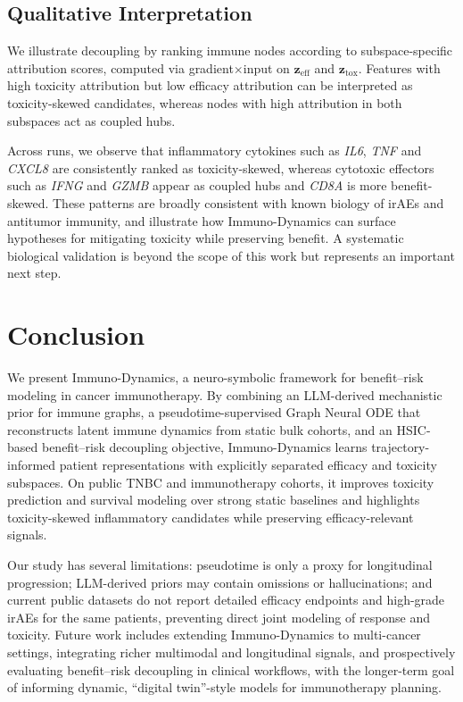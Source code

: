 \documentclass{article}
\begin{document}
\subsection{Qualitative Interpretation}

We illustrate decoupling by ranking immune nodes according to subspace-specific attribution scores, computed via gradient$\times$input on $\mathbf{z}_{\mathrm{eff}}$ and $\mathbf{z}_{\mathrm{tox}}$.
Features with high toxicity attribution but low efficacy attribution can be interpreted as toxicity-skewed candidates, whereas nodes with high attribution in both subspaces act as coupled hubs.

Across runs, we observe that inflammatory cytokines such as \emph{IL6}, \emph{TNF} and \emph{CXCL8} are consistently ranked as toxicity-skewed, whereas cytotoxic effectors such as \emph{IFNG} and \emph{GZMB} appear as coupled hubs and \emph{CD8A} is more benefit-skewed.
These patterns are broadly consistent with known biology of irAEs and antitumor immunity, and illustrate how Immuno-Dynamics can surface hypotheses for mitigating toxicity while preserving benefit.
A systematic biological validation is beyond the scope of this work but represents an important next step.

\section{Conclusion}
\label{sec:conclusion}

We present Immuno-Dynamics, a neuro-symbolic framework for benefit--risk modeling in cancer immunotherapy. By combining an LLM-derived mechanistic prior for immune graphs, a pseudotime-supervised Graph Neural ODE that reconstructs latent immune dynamics from static bulk cohorts, and an HSIC-based benefit--risk decoupling objective, Immuno-Dynamics learns trajectory-informed patient representations with explicitly separated efficacy and toxicity subspaces. On public TNBC and immunotherapy cohorts, it improves toxicity prediction and survival modeling over strong static baselines and highlights toxicity-skewed inflammatory candidates while preserving efficacy-relevant signals.

Our study has several limitations: pseudotime is only a proxy for longitudinal progression; LLM-derived priors may contain omissions or hallucinations; and current public datasets do not report detailed efficacy endpoints and high-grade irAEs for the same patients, preventing direct joint modeling of response and toxicity. Future work includes extending Immuno-Dynamics to multi-cancer settings, integrating richer multimodal and longitudinal signals, and prospectively evaluating benefit--risk decoupling in clinical workflows, with the longer-term goal of informing dynamic, ``digital twin''-style models for immunotherapy planning.
\end{document}
